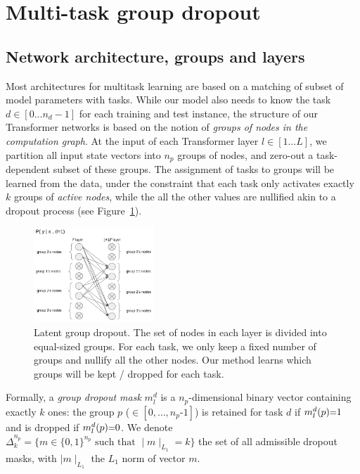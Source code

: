 \documentclass[11pt]{article}
\newcommand{\fyDone}[1]{\done[FY]\Todo[FY:]{\textcolor{orange}{#1}}}
\begin{document}
\section{Multi-task group dropout \label{sec:architecture}}
\subsection{Network architecture, groups and layers}
Most architectures for multitask learning are based on a matching of subset of model parameters with tasks. While our model also needs to know the task $d \in [0 \dots n_d-1]$ for each training and test instance, the structure of our Transformer networks \citep{Vaswani17attention} is based on the notion of \emph{groups of nodes in the computation graph}. At the input of each Transformer layer $l \in [1 \dots L]$, we partition all input state vectors into $n_p$ groups of nodes, and zero-out a task-dependent subset of these groups.\fyDone{In the attention heads only? In the FF?} The assignment of tasks to groups will be learned from the data, under the constraint that each task only activates exactly $k$ groups of \emph{active nodes}, while the all the other values are nullified akin to a dropout process (see Figure~\ref{fig:group_dropout}).
\begin{figure}
  \centering
\includegraphics[width=0.4\textwidth]{group_dropout}
\caption{Latent group dropout. The set of nodes\fyDone{parameters ?} in each layer is divided into equal-sized groups. For each task, we only keep a fixed number of groups and nullify all the other nodes. Our method learns which groups will be kept / dropped for each task.}
\label{fig:group_dropout}
\end{figure}
Formally, a \emph{group dropout mask} $m_l^d$ is a $n_p$-dimensional binary vector containing exactly $k$ ones: the group $p$ ($\in  [0,\dots,n_p\text{-}1]$) is retained for task $d$ if $m_l^d(p)\text{\small =}1$ and is dropped if $m_l^d(p)\text{\small =} 0$. We denote $\Delta^{n_p}_k = \{ m \in \{0,1\}^{n_p} \text{ such that }  \mid{} m \mid_{L_1} = k \}$ the set of all admissible dropout masks, with $\mid{} m \mid_{L_1}$ the $L_1$ norm of vector $m$.
\end{document}
